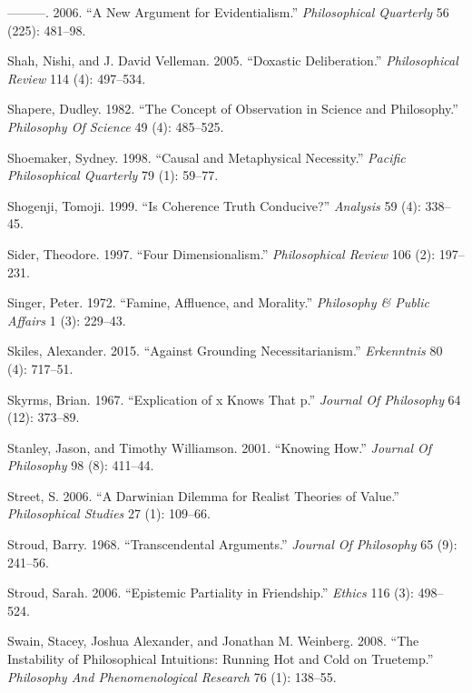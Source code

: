 \documentclass[
  10pt,
  letterpaper,
  DIV=11,
  numbers=noendperiod,
  twoside]{scrartcl}
\newlength{\cslhangindent}
\newenvironment{CSLReferences}[2] %
 {\begin{list}{}{%
  \setlength{\itemindent}{0pt}
  \setlength{\leftmargin}{0pt}
  \setlength{\parsep}{0pt}
  \ifodd #1
   \setlength{\leftmargin}{\cslhangindent}
   \setlength{\itemindent}{-1\cslhangindent}
  \fi
  \setlength{\itemsep}{#2\baselineskip}}}
 {\end{list}}
\begin{document}
\begin{CSLReferences}{1}{0}
---------. 2006. {``A New Argument for Evidentialism.''}
\emph{Philosophical Quarterly} 56 (225): 481--98.

Shah, Nishi, and J. David Velleman. 2005. {``Doxastic Deliberation.''}
\emph{Philosophical Review} 114 (4): 497--534.

Shapere, Dudley. 1982. {``The Concept of Observation in Science and
Philosophy.''} \emph{Philosophy Of Science} 49 (4): 485--525.

Shoemaker, Sydney. 1998. {``Causal and Metaphysical Necessity.''}
\emph{Pacific Philosophical Quarterly} 79 (1): 59--77.

Shogenji, Tomoji. 1999. {``Is Coherence Truth Conducive?''}
\emph{Analysis} 59 (4): 338--45.

Sider, Theodore. 1997. {``Four Dimensionalism.''} \emph{Philosophical
Review} 106 (2): 197--231.

Singer, Peter. 1972. {``Famine, Affluence, and Morality.''}
\emph{Philosophy \& Public Affairs} 1 (3): 229--43.

Skiles, Alexander. 2015. {``Against Grounding Necessitarianism.''}
\emph{Erkenntnis} 80 (4): 717--51.

Skyrms, Brian. 1967. {``Explication of x Knows That p.''} \emph{Journal
Of Philosophy} 64 (12): 373--89.

Stanley, Jason, and Timothy Williamson. 2001. {``Knowing How.''}
\emph{Journal Of Philosophy} 98 (8): 411--44.

Street, S. 2006. {``A Darwinian Dilemma for Realist Theories of
Value.''} \emph{Philosophical Studies} 27 (1): 109--66.

Stroud, Barry. 1968. {``Transcendental Arguments.''} \emph{Journal Of
Philosophy} 65 (9): 241--56.

Stroud, Sarah. 2006. {``Epistemic Partiality in Friendship.''}
\emph{Ethics} 116 (3): 498--524.

Swain, Stacey, Joshua Alexander, and Jonathan M. Weinberg. 2008. {``The
Instability of Philosophical Intuitions: Running Hot and Cold on
Truetemp.''} \emph{Philosophy And Phenomenological Research} 76 (1):
138--55.


\end{CSLReferences}
\end{document}
